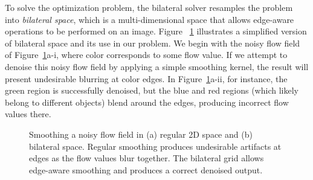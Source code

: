 To solve the optimization problem, the bilateral solver resamples the problem into \emph{bilateral space}, which is a multi-dimensional space that allows edge-aware operations to be performed on an image.
Figure ~\ref{fig:bilateral_grid_3d} illustrates a simplified version of bilateral space and its use in our problem.
We begin with the noisy flow field of Figure~\ref{fig:bilateral_grid_3d}a-i, where color corresponds to some flow value.
If we attempt to denoise this noisy flow field by applying a simple smoothing kernel, the result will present undesirable blurring at color edges.
In Figure~\ref{fig:bilateral_grid_3d}a-ii, for instance, the green region is successfully denoised, but the blue and red regions (which likely belong to different objects) blend around the edges, producing incorrect flow values there.


\newlength\largefigure %
\setlength{\largefigure}{\columnwidth+\marginparsep+%
\marginparwidth} %
\begin{figure}[h]%
\centering%
\center
{} %
\captionsetup{width=\largefigure}
\caption{Smoothing a noisy flow field in (a) regular 2D space and (b) bilateral space. Regular smoothing produces undesirable artifacts at edges as the flow values blur together. The bilateral grid allows edge-aware smoothing and produces a correct denoised output.}%
\label{fig:bilateral_grid_3d}%
\end{figure}



